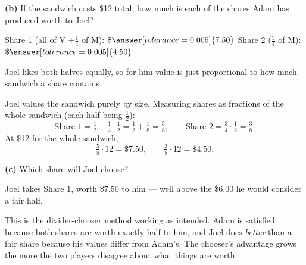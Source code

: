 \documentclass[12pt]{ximera}
\begin{document}
\begin{problem}
\begin{prompt}
\textbf{(b)} If the sandwich costs \$12 total, how much is each of the shares Adam has
produced worth to Joel?

Share 1 (all of V $+\frac14$ of M): $\$\answer[tolerance=0.005]{7.50}$ \qquad
Share 2 ($\frac34$ of M): $\$\answer[tolerance=0.005]{4.50}$

\begin{hint}
Joel likes both halves equally, so for him value is just proportional to how much
sandwich a share contains.
\end{hint}

\begin{feedback}
Joel values the sandwich purely by size. Measuring shares as fractions of the whole
sandwich (each half being $\frac12$):
\[
\text{Share 1} = \tfrac12 + \tfrac14\cdot\tfrac12 = \tfrac12+\tfrac18 = \tfrac58,
\qquad
\text{Share 2} = \tfrac34\cdot\tfrac12 = \tfrac38.
\]
At \$12 for the whole sandwich,
\[
\tfrac58 \cdot 12 = \$7.50, \qquad \tfrac38\cdot 12 = \$4.50.
\]
\end{feedback}
\end{prompt}

\begin{prompt}
\textbf{(c)} Which share will Joel choose?

\begin{multipleChoice}
\end{multipleChoice}

\begin{feedback}
Joel takes Share 1, worth \$7.50 to him --- well above the \$6.00 he would consider a
fair half.

This is the divider-chooser method working as intended. Adam is satisfied because both
shares are worth exactly half to him, and Joel does \emph{better} than a fair share
because his values differ from Adam's. The chooser's advantage grows the more the two
players disagree about what things are worth.
\end{feedback}
\end{prompt}
\end{problem}
\end{document}
